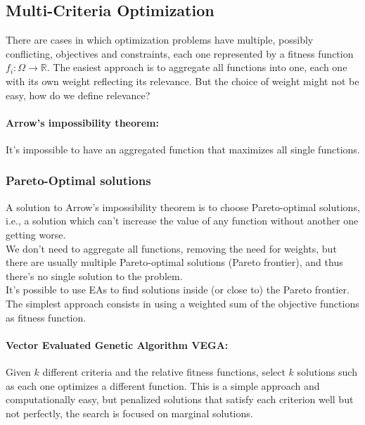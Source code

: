 \subsection{Multi-Criteria Optimization}

There are cases in which optimization problems have multiple, possibly conflicting, objectives and constraints, each one represented by a fitness function $f_i: \Omega \rightarrow \mathbb{R}$. The easiest approach is to aggregate all functions into one, each one with its own weight reflecting its relevance. But the choice of weight might not be easy, how do we define relevance? 

\paragraph{Arrow's impossibility theorem:} It's impossible to have an aggregated function that maximizes all single functions.\\

\subsubsection{Pareto-Optimal solutions}
A solution to Arrow's impossibility theorem is to choose Pareto-optimal solutions, i.e., a solution which can't increase the value of any function without another one getting worse. \\
We don't need to aggregate all functions, removing the need for weights, but there are usually multiple Pareto-optimal solutions (Pareto frontier), and thus there's no single solution to the problem. \\

It's possible to use EAs to find solutions inside (or close to) the Pareto frontier. The simplest approach consists in using a weighted sum of the objective functions as fitness function.\\

\paragraph{Vector Evaluated Genetic Algorithm VEGA:} Given $k$ different criteria and the relative fitness functions, select $k$ solutions such as each one optimizes a different function. This is a simple approach and computationally easy, but penalized solutions that satisfy each criterion well but not perfectly, the search is focused on marginal solutions.\\

